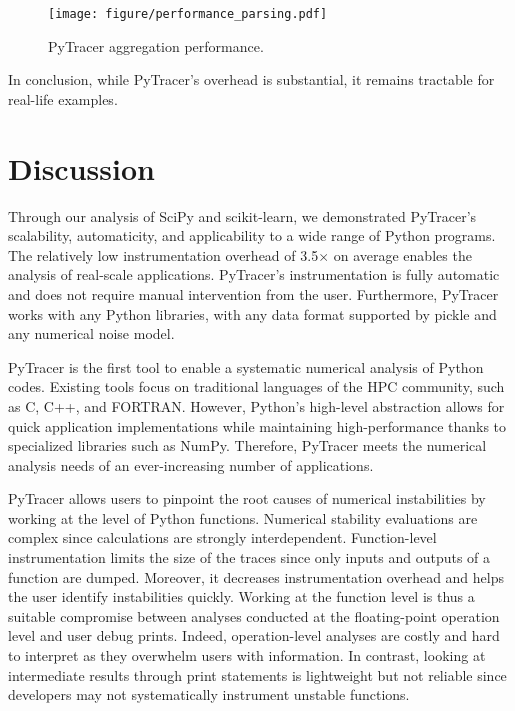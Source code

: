 \documentclass[10pt,journal,compsoc]{IEEEtran}
\newcommand{\pytracer}[0]{PyTracer\xspace}
\begin{document}
\begin{figure}
    \centering
    \texttt{[image: figure/performance\_parsing.pdf]}
    \caption{\pytracer aggregation performance.
    }
    \label{fig:performance_parsing}
\end{figure}


In conclusion, while \pytracer's overhead is substantial, it remains tractable
for real-life examples.

\section{Discussion}

Through our analysis of SciPy and scikit-learn, we demonstrated \pytracer's
scalability, automaticity, and applicability to a wide range of Python programs.
The relatively low instrumentation overhead of 3.5$\times$ on average enables
the analysis of real-scale applications. \pytracer's instrumentation is fully
automatic and does not require manual intervention from the user. Furthermore,
\pytracer works with any Python libraries, with any data format supported by
pickle and any numerical noise model.

\pytracer is the first tool to enable a systematic numerical analysis of Python
codes. Existing tools focus on traditional languages of the HPC community, such
as C, C++, and FORTRAN. However, Python's high-level abstraction allows for
quick application implementations while maintaining high-performance thanks to
specialized libraries such as NumPy. Therefore, \pytracer meets the numerical
analysis needs of an ever-increasing number of applications.

\pytracer allows users to pinpoint the root causes of numerical instabilities by
working at the level of Python functions. Numerical stability evaluations are complex since
calculations are strongly interdependent. Function-level instrumentation limits
the size of the traces since only inputs and outputs of a function are dumped.
Moreover, it decreases instrumentation overhead and helps the user identify
instabilities quickly. Working at the function level is thus a suitable
compromise between analyses conducted at the floating-point operation level and
user debug prints. Indeed, operation-level analyses are costly and hard to
interpret as they overwhelm users with information. In contrast, looking at
intermediate results through print statements is lightweight but not reliable
since developers may not systematically instrument unstable functions. 
\end{document}

